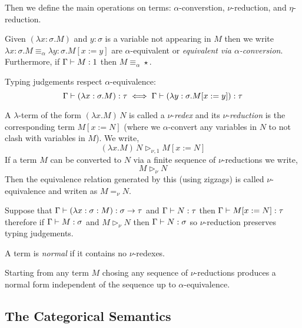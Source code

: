 \documentclass[12pt]{article}
\newcommand{\red}{\triangleright}
\newcommand{\aconv}{\equiv_{\alpha}}
\newcommand{\bredo}{\red_{\nu,1}}
\newcommand{\bred}{\red_{\nu}}
\begin{document}
Then we define the main operations on terms: $\alpha$-converstion, $\nu$-reduction, and $\eta$-reduction.

\begin{defn}
Given $(\lambda x : \sigma . M)$ and $y : \sigma$ is a variable not appearing in $M$ then we write $\lambda x : \sigma . M \aconv \lambda y : \sigma . M[x := y]$ are $\alpha$-equivalent or \textit{equivalent via $\alpha$-conversion}. Furthermore, if $\Gamma \vdash M : 1$ then $M \aconv \star$.
\end{defn}

\begin{prop}
Typing judgements respect $\alpha$-equivalence:
\[ \Gamma \vdash (\lambda x : \sigma . M) : \tau \iff \Gamma \vdash (\lambda y : \sigma . M[x := y]) : \tau \]
\end{prop}

\begin{defn}
A $\lambda$-term of the form $(\lambda x.M) \, N$ is called a $\nu$-\textit{redex} and its $\nu$-\textit{reduction} is the corresponding term $M [x := N]$ (where we $\alpha$-convert any variables in $N$ to not clash with variables in $M$). We write,
\[ (\lambda x.M) \, N \bredo M [x := N] \]
If a term $M$ can be converted to $N$ via a finite sequence of $\nu$-reductions we write,
\[ M \bred N \]
Then the equivalence relation generated by this (using zigzags) is called $\nu$-equivalence and writen as $M =_\nu N$. 
\end{defn}

\begin{prop}
Suppose that $\Gamma \vdash (\lambda x : \sigma : M) : \sigma \to \tau$ and $\Gamma \vdash N : \tau$ then $\Gamma \vdash M[x := N] : \tau$ therefore if $\Gamma \vdash M : \sigma$ and $M \bred N$ then $\Gamma \vdash N : \sigma$ so $\nu$-reduction preserves typing judgements.
\end{prop}

\begin{defn}
A term is \textit{normal} if it contains no $\nu$-redexes. 
\end{defn}

\begin{theorem}
Starting from any term $M$ chosing any sequence of $\nu$-reductions produces a normal form independent of the sequence up to $\alpha$-equivalence.
\end{theorem}

\subsection{The Categorical Semantics}
\end{document}
